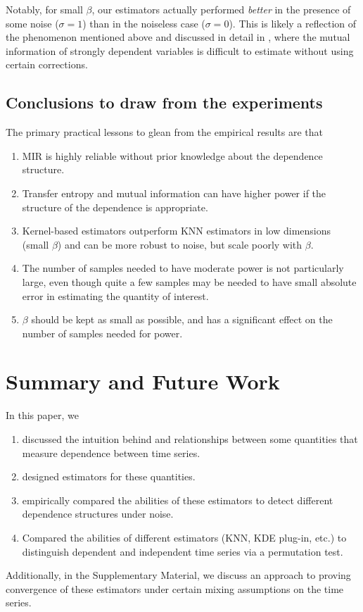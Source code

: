 \documentclass{article} %
\begin{document}
Notably, for small $\beta$, our estimators actually performed \emph{better} in
the presence of some noise ($\sigma = 1$) than in the noiseless case
($\sigma = 0$). This is likely a reflection of the phenomenon mentioned above
and discussed in detail in \citet{gao2014stronglyDependent}, where the mutual
information of strongly dependent variables is difficult to estimate without
using certain corrections.

\subsection{Conclusions to draw from the experiments}
The primary practical lessons to glean from the empirical results are that
\begin{enumerate}
\item MIR is highly reliable without prior knowledge about the dependence
structure.
\item Transfer entropy and mutual information can have higher power
if the structure of the dependence is appropriate.
\item Kernel-based estimators outperform KNN estimators in low dimensions
(small $\beta$) and can be more robust to noise, but scale poorly with $\beta$.
\item The number of samples needed to have moderate power is not particularly
large, even though quite a few samples may be needed to have small absolute
error in estimating the quantity of interest.
\item $\beta$ should be kept as small as possible, and has a significant effect
on the number of samples needed for power.
\end{enumerate}

\section{Summary and Future Work}
In this paper, we
\begin{enumerate}
\item discussed the intuition behind and relationships between some quantities
that measure dependence between time series.
\item designed estimators for these quantities.
\item empirically compared the abilities of these estimators to detect
different dependence structures under noise.
\item Compared the abilities of different estimators (KNN, KDE plug-in, etc.)
to distinguish dependent and independent time series via a permutation test.
\end{enumerate}
Additionally, in the Supplementary Material, we discuss an approach to proving
convergence of these estimators under certain mixing assumptions on the time
series.
\end{document}
